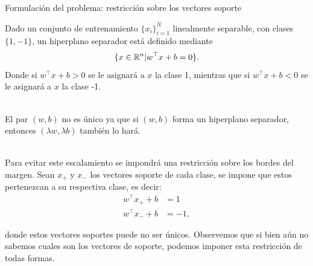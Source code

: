 \documentclass[handout, 9pt]{beamer}
\begin{document}
\begin{frame}{Formulación del problema: restricción sobre los vectores soporte}

Dado un conjunto de entrenamiento $\{x_i\}_{i=1}^N$ linealmente separable, con clases $\{1,-1\}$, un hiperplano separador está definido mediante
\begin{equation*}
    \{x\in \mathbb{R}^n | w^\top x + b = 0 \}.
\end{equation*}
Donde si $w^\top x + b >0$ se le asignará a $x$ la clase 1, mientras que si $w^\top x + b <0$ se le asignará a $x$ la clase -1.\\~\ \pause

El par $(w,b)$ no es único ya que si $(w,b)$ forma un hiperplano separador, entonces $(\lambda w, \lambda b)$ también lo hará.\\~\ \pause

Para evitar este escalamiento se impondrá una restricción sobre los bordes del margen. Sean $x_{+}$ y $x_{-}$ los vectores soporte de cada clase, se impone que estos pertenezcan a su respectiva clase, es decir:
\begin{align*}
 	w^\top x_{+} + b &= 1\\
 	w^\top x_{-} + b &=  -1,
 \end{align*}
 
 donde estos vectores soportes puede no ser únicos. Observemos que si bien aún no sabemos cuales son los vectores de soporte, podemos imponer esta restricción de todas formas.
 	
\end{frame}
\end{document}
